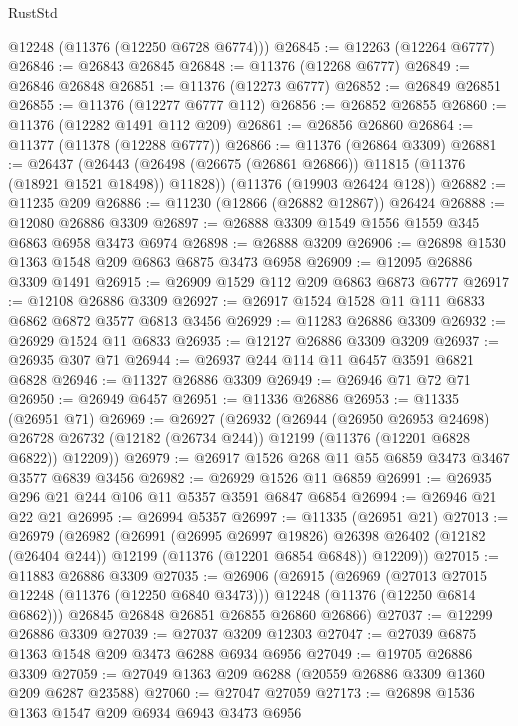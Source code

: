 \begin{lexlean}{RustStd}
\begin{coremodule}
{{{{{{{{{{{{{{{{{{{      @12248
      (@11376 (@12250 @6728 @6774)))
@26845 := @12263 (@12264 @6777)
@26846 := @26843 @26845
@26848 := @11376 (@12268 @6777)
@26849 := @26846 @26848
@26851 := @11376 (@12273 @6777)
@26852 := @26849 @26851
@26855 := @11376 (@12277 @6777 @112)
@26856 := @26852 @26855
@26860 := @11376 (@12282 @1491 @112 @209)
@26861 := @26856 @26860
@26864 := @11377 (@11378 (@12288 @6777))
@26866 := @11376 (@26864 @3309)
@26881 := @26437
    (@26443 (@26498 (@26675 (@26861 @26866)) @11815 (@11376 (@18921 @1521 @18498)) @11828))
    (@11376 (@19903 @26424 @128))
@26882 := @11235 @209
@26886 := @11230 (@12866 (@26882 @12867)) @26424
@26888 := @12080 @26886 @3309
@26897 := @26888 @3309 @1549 @1556 @1559 @345 @6863 @6958 @3473 @6974
@26898 := @26888 @3209
@26906 := @26898 @1530 @1363 @1548 @209 @6863 @6875 @3473 @6958
@26909 := @12095 @26886 @3309 @1491
@26915 := @26909 @1529 @112 @209 @6863 @6873 @6777
@26917 := @12108 @26886 @3309
@26927 := @26917 @1524 @1528 @11 @111 @6833 @6862 @6872 @3577 @6813 @3456
@26929 := @11283 @26886 @3309
@26932 := @26929 @1524 @11 @6833
@26935 := @12127 @26886 @3309 @3209
@26937 := @26935 @307 @71
@26944 := @26937 @244 @114 @11 @6457 @3591 @6821 @6828
@26946 := @11327 @26886 @3309
@26949 := @26946 @71 @72 @71
@26950 := @26949 @6457
@26951 := @11336 @26886
@26953 := @11335 (@26951 @71)
@26969 := @26927
    (@26932
      (@26944
        (@26950 @26953 @24698)
        @26728
        @26732
        (@12182 (@26734 @244))
        @12199
        (@11376 (@12201 @6828 @6822))
        @12209))
@26979 := @26917 @1526 @268 @11 @55 @6859 @3473 @3467 @3577 @6839 @3456
@26982 := @26929 @1526 @11 @6859
@26991 := @26935 @296 @21 @244 @106 @11 @5357 @3591 @6847 @6854
@26994 := @26946 @21 @22 @21
@26995 := @26994 @5357
@26997 := @11335 (@26951 @21)
@27013 := @26979
    (@26982
      (@26991
        (@26995 @26997 @19826)
        @26398
        @26402
        (@12182 (@26404 @244))
        @12199
        (@11376 (@12201 @6854 @6848))
        @12209))
@27015 := @11883 @26886 @3309
@27035 := @26906
    (@26915
      (@26969
        (@27013 @27015 @12248 (@11376 (@12250 @6840 @3473)))
        @12248
        (@11376 (@12250 @6814 @6862)))
      @26845
      @26848
      @26851
      @26855
      @26860
      @26866)
@27037 := @12299 @26886 @3309
@27039 := @27037 @3209 @12303
@27047 := @27039 @6875 @1363 @1548 @209 @3473 @6288 @6934 @6956
@27049 := @19705 @26886 @3309
@27059 := @27049 @1363 @209 @6288 (@20559 @26886 @3309 @1360 @209 @6287 @23588)
@27060 := @27047 @27059
@27173 := @26898
    @1536
    @1363
    @1547
    @209
    @6934
    @6943
    @3473
    @6956
}}}}}}}}}}}}}}}}}}}
\end{coremodule}
\end{lexlean}
